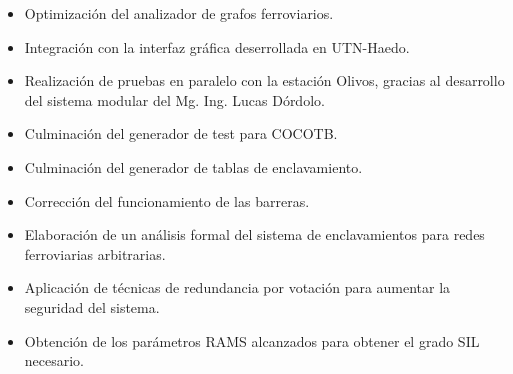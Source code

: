 	\begin{itemize}
		\item Optimización del analizador de grafos ferroviarios.
		\item Integración con la interfaz gráfica deserrollada en UTN-Haedo.
		\item Realización de pruebas en paralelo con la estación Olivos, gracias al desarrollo del sistema modular del Mg. Ing. Lucas Dórdolo.
		\item Culminación del generador de test para COCOTB.
		\item Culminación del generador de tablas de enclavamiento.
		\item Corrección del funcionamiento de las barreras.
		\item Elaboración de un análisis formal del sistema de enclavamientos para redes ferroviarias arbitrarias.
		\item Aplicación de técnicas de redundancia por votación para aumentar la seguridad del sistema.
		\item Obtención de los parámetros RAMS alcanzados para obtener el grado SIL necesario.
	\end{itemize}

